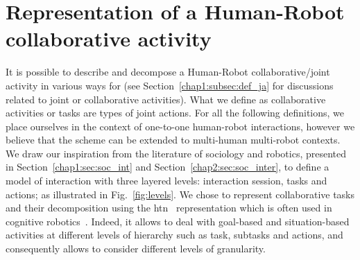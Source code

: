 \documentclass[a4paper,11pt,twoside]{StyleThese}
\begin{document}
\section{Representation of a Human-Robot collaborative activity}\label{chap5:sec:levels}
It is possible to describe and decompose a Human-Robot collaborative/joint activity in various ways for (see Section~\ref{chap1:subsec:def_ja} for discussions related to joint or collaborative activities). What we define as collaborative activities or tasks are types of joint actions. For all the following definitions, we place ourselves in the context of one-to-one human-robot interactions, however we  believe that the scheme can be extended to multi-human multi-robot contexts. 
We draw our inspiration from the literature of sociology and robotics, presented in Section~\ref{chap1:sec:soc_int} and Section~\ref{chap2:sec:soc_inter}, to define a model of interaction with three layered levels: interaction session, tasks and actions; as illustrated in Fig.~\ref{fig:levels}. We chose to represent collaborative tasks and their decomposition using the \acrfull{htn}~\citep{ghallab_2016_automated} representation which is often used in cognitive robotics~\citep{ingrand-2017,lallement_2014_hatp, buisan_2021_human}. Indeed, it allows to deal with goal-based and situation-based activities at different levels of hierarchy such as task, subtasks and actions, and consequently allows to consider different levels of granularity. 

\end{document}
